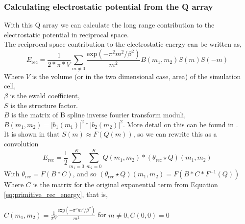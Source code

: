 \documentclass[pdftex,twoside,a4paper]{report}
\newcommand{\bcen}{\begin{center}}
\newcommand{\ecen}{\end{center}}
\begin{document}
\subsubsection{Calculating electrostatic potential from the Q array}
With this Q array we can calculate the long range contribution to the electrostatic potential in reciprocal space.\\
The reciprocal space contribution to the electrostatic energy can be written as,\\
\begin{equation}
E_{\text{rec}} = \frac{1}{2*\pi*V} \sum_{m \not= 0} \frac{\text{exp}(- \pi^2 m^2 / \beta^2)}{m^2} B(m_1,m_2) S(m) S(-m)
  \label{eq:primitive_rec_energy} \end{equation}
Where $V$ is the volume (or in the two dimensional case, area) of the simulation cell,\\
$\beta$ is the ewald coefficient,\\
$S$ is the structure factor.\\
$B$ is the matrix of B spline inverse fourier transform moduli, $B(m_1,m_2) = |b_1(m_1)|^2 * |b_2(m_2)|^2$. More detail on this can be found in \cite{essmann:8577}.\\
It is shown in \cite{essmann:8577} that $S(m) \approx F(Q(m))$, so we can rewrite this as a convolution\\
\begin{equation}
E_{\text{rec}} = \frac{1}{2} \sum_{m_1 = 0}^K \sum_{m_2 = 0}^K Q(m_1,m_2) * (\theta_{\text{rec}} \star Q)(m_1,m_2)
\label{eq:energy_rec}
\end{equation}
With $\theta_{\text{rec}} = F(B * C)$, and so $(\theta_{\text{rec}} \star Q)(m_1,m_2) = F(B * C * F^{-1}(Q))$ \cite{essmann:8577} \cite{lee05}\\
Where $C$ is the matrix for the original exponential term from Equation \ref{eq:primitive_rec_energy}, that is,
 \bcen$\displaystyle
C(m_1,m_2) = \frac{1}{\pi V} \frac{\text{exp}(- \pi^2 m^2 / \beta^2)}{m^2} $ for $ m \not= 0, C(0,0) = 0
$\ecen 
\end{document}
